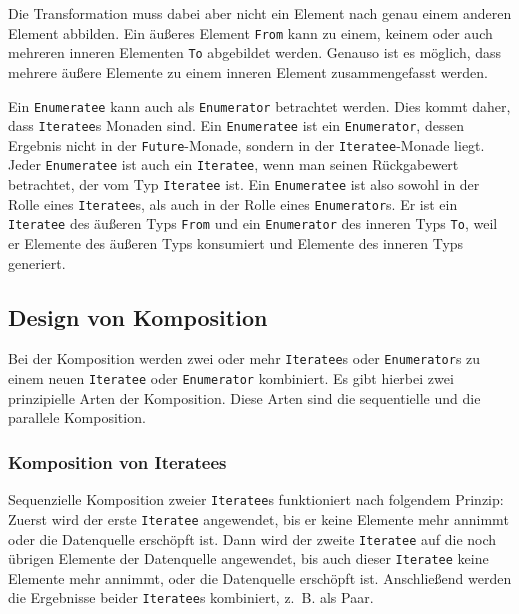 Die Transformation muss dabei aber nicht ein Element nach genau einem anderen Element abbilden.
Ein äußeres Element \lstinline|From| kann zu einem, keinem oder auch mehreren inneren Elementen \lstinline|To| abgebildet werden.
Genauso ist es möglich, dass mehrere äußere Elemente zu einem inneren Element zusammengefasst werden.

Ein \lstinline|Enumeratee| kann auch als \lstinline|Enumerator| betrachtet werden.
Dies kommt daher, dass \lstinline|Iteratee|s Monaden sind.
Ein \lstinline|Enumeratee| ist ein \lstinline|Enumerator|, dessen Ergebnis nicht in der \lstinline|Future|-Monade, sondern in der \lstinline|Iteratee|-Monade liegt.
Jeder \lstinline|Enumeratee| ist auch ein \lstinline|Iteratee|, wenn man seinen Rückgabewert betrachtet, der vom Typ \lstinline|Iteratee| ist.
Ein \lstinline|Enumeratee| ist also sowohl in der Rolle eines \lstinline|Iteratee|s, als auch in der Rolle eines \lstinline|Enumerator|s.
Er ist ein \lstinline|Iteratee| des äußeren Typs \lstinline|From| und ein \lstinline|Enumerator| des inneren Typs \lstinline|To|, weil er Elemente des äußeren Typs konsumiert und Elemente des inneren Typs generiert.



\subsection{Design von Komposition} %
\label{sub:komposition}

Bei der Komposition werden zwei oder mehr \lstinline|Iteratee|s oder \lstinline|Enumerator|s zu einem neuen \lstinline|Iteratee| oder \lstinline|Enumerator| kombiniert.
Es gibt hierbei zwei prinzipielle Arten der Komposition.
Diese Arten sind die sequentielle und die parallele Komposition.

\subsubsection{Komposition von Iteratees} %
\label{ssub:komposition_von_iteratees}

Sequenzielle Komposition zweier \lstinline|Iteratee|s funktioniert nach folgendem Prinzip:
Zuerst wird der erste \lstinline|Iteratee| angewendet, bis er keine Elemente mehr annimmt oder die Datenquelle erschöpft ist.
Dann wird der zweite \lstinline|Iteratee| auf die noch übrigen Elemente der Datenquelle angewendet, bis auch dieser \lstinline|Iteratee| keine Elemente mehr annimmt, oder die Datenquelle erschöpft ist.
Anschließend werden die Ergebnisse beider \lstinline|Iteratee|s kombiniert, z.~B. als Paar. %

